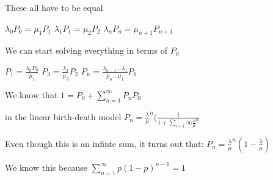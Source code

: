 \documentclass[12pt]{report}
\begin{document}
These all have to be equal

$\lambda_0 P_0 = \mu_1 P_1$
$\lambda_1 P_1 = \mu_2 P_2$
$\lambda_n P_n= \mu_{n+1} P_{n+1}$

We can start solving everything in terms of $P_0$

$P_1 = \frac{\lambda_0 P_0}{\mu_1}$
$P_3 = \frac{\lambda_2}{\mu_3} P_2$
$P_n = \frac{\lambda_{n-1} ... \lambda_1}{\mu_n ... \mu_1} P_0$

We know that $1= P_0 + \sum_{n=1}^\infty P_n P_0$

in the linear birth-death model
$P_n = \frac{\lambda}{\mu}^n (\frac{1}{1+\sum_{i=1}{\infty} \frac{\lambda}{\mu}^n}$

Even though this is an infinte sum, it turns out that:
$P_n= \frac{\lambda}{\mu}^n (1-\frac{\lambda}{\mu})$

We know this because $\sum_{n=1}^\infty p(1-p)^{n-1} = 1$
\end{document}
